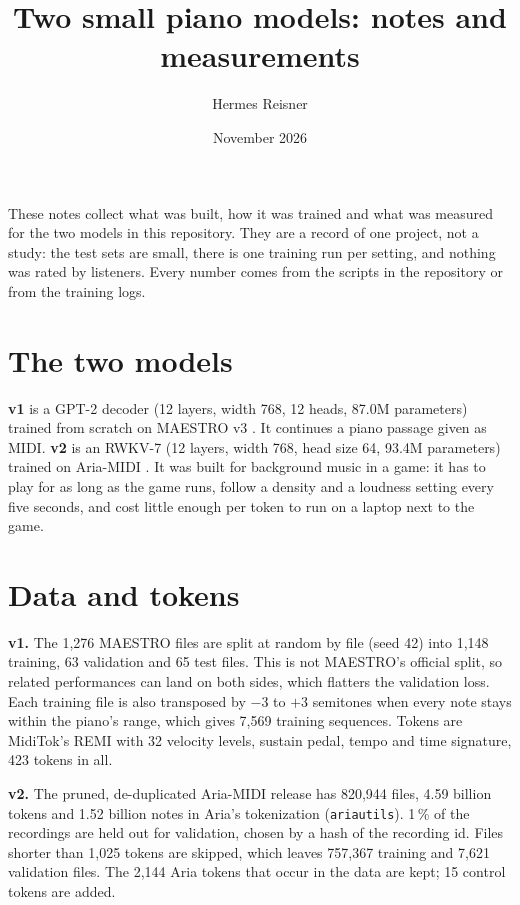 \documentclass[11pt,a4paper]{article}
\title{Two small piano models: notes and measurements}
\author{Hermes Reisner}
\date{November 2026}
\begin{document}
\maketitle

These notes collect what was built, how it was trained and what was measured for the two models in this
repository. They are a record of one project, not a study: the test sets are small, there is one training run per
setting, and nothing was rated by listeners. Every number comes from the scripts in the repository or from the
training logs.

\section{The two models}

\textbf{v1} is a GPT-2 decoder (12 layers, width 768, 12 heads, 87.0M parameters) trained from scratch on
MAESTRO v3 \cite{maestro}. It continues a piano passage given as MIDI. \textbf{v2} is an RWKV-7 \cite{rwkv7}
(12 layers, width 768, head size 64, 93.4M parameters) trained on Aria-MIDI \cite{ariamidi}. It was built for
background music in a game: it has to play for as long as the game runs, follow a density and a loudness setting
every five seconds, and cost little enough per token to run on a laptop next to the game.

\section{Data and tokens}

\textbf{v1.} The 1,276 MAESTRO files are split at random by file (seed 42) into 1,148 training, 63 validation
and 65 test files. This is not MAESTRO's official split, so related performances can land on both sides, which
flatters the validation loss. Each training file is also transposed by $-3$ to $+3$ semitones when every note
stays within the piano's range, which gives 7,569 training sequences. Tokens are MidiTok's REMI
\cite{remi,miditok} with 32 velocity levels, sustain pedal, tempo and time signature, 423 tokens in all.

\textbf{v2.} The pruned, de-duplicated Aria-MIDI release has 820,944 files, 4.59 billion tokens and 1.52 billion
notes in Aria's tokenization (\texttt{ariautils}). 1\,\% of the recordings are held out for validation, chosen by
a hash of the recording id. Files shorter than 1,025 tokens are skipped, which leaves 757,367 training and 7,621
validation files. The 2,144 Aria tokens that occur in the data are kept; 15 control tokens are added.
\end{document}
